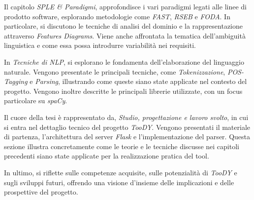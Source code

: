 \documentclass[12pt]{report}
\newcommand{\toody}{\textsl{TooDY}\xspace}
\newcommand{\flask}{\textsl{Flask}\xspace}
\newcommand{\spacy}{\textsl{spaCy}\xspace}
\begin{document}
Il capitolo \textsl{SPLE \& Paradigmi}, approfondisce i vari paradigmi legati alle linee di prodotto software, esplorando metodologie come \textit{FAST}, \textit{RSEB} e \textit{FODA}. In particolare, si discutono le tecniche di analisi del dominio e la rappresentazione attraverso \textit{Features Diagrams}. Viene anche affrontata la tematica dell’ambiguità linguistica e come essa possa introdurre variabilità nei requisiti.

In \textsl{Tecniche di NLP}, si esplorano le fondamenta dell'elaborazione del linguaggio naturale. Vengono presentate le principali tecniche, come \textit{Tokenizzazione}, \textit{POS-Tagging} e \textit{Parsing}, illustrando come queste siano state applicate nel contesto del progetto. Vengono inoltre descritte le principali librerie utilizzate, con un focus particolare su \spacy.

Il cuore della tesi è rappresentato da, \textsl{Studio, progettazione e lavoro svolto}, in cui si entra nel dettaglio tecnico del progetto \toody. Vengono presentati il materiale di partenza, l'architettura del server \flask e l’implementazione del parser. Questa sezione illustra concretamente come le teorie e le tecniche discusse nei capitoli precedenti siano state applicate per la realizzazione pratica del tool.

In ultimo, si riflette sulle competenze acquisite, sulle potenzialità di \toody e sugli sviluppi futuri, offrendo una visione d'insieme delle implicazioni e delle prospettive del progetto.

\end{document}
